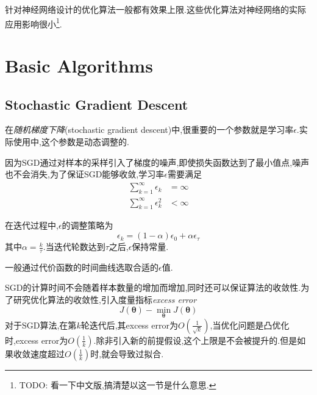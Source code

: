 针对神经网络设计的优化算法一般都有效果上限.这些优化算法对神经网络的实际应用影响很小\footnote{TODO: 看一下中文版,搞清楚以这一节是什么意思.}.

\section{Basic Algorithms}

\subsection{Stochastic Gradient Descent}

在\textit{随机梯度下降}(stochastic gradient descent)中,很重要的一个参数就是学习率$\epsilon$.实际使用中,这个参数是动态调整的.

因为SGD通过对样本的采样引入了梯度的噪声,即使损失函数达到了最小值点,噪声也不会消失,为了保证SGD能够收敛,学习率$\epsilon$需要满足
\begin{equation}\begin{split}
\sum_{k=1}^\infty\epsilon_k&=\infty\\
\sum_{k=1}^\infty\epsilon_k^2&<\infty
\end{split}\end{equation}

在迭代过程中,$\epsilon$的调整策略为
\begin{equation}
\epsilon_k=(1-\alpha)\epsilon_0+\alpha\epsilon_\tau
\end{equation}
其中$\alpha=\frac{k}{\tau}$.当迭代轮数达到$\tau$之后,$\epsilon$保持常量.

一般通过代价函数的时间曲线选取合适的$\epsilon$值.

SGD的计算时间不会随着样本数量的增加而增加,同时还可以保证算法的收敛性.为了研究优化算法的收敛性,引入度量指标\textit{excess error}
\begin{equation}
J(\mathbf\theta)-\min_{\mathbf\theta}J(\mathbf\theta)
\end{equation}
对于SGD算法,在第$k$轮迭代后,其excess error为$O(\frac{1}{\sqrt{k}})$,当优化问题是凸优化时,excess error为$O(\frac{1}{k})$.除非引入新的前提假设,这个上限是不会被提升的.但是如果收敛速度超过$O(\frac{1}{k})$时,就会导致过拟合.